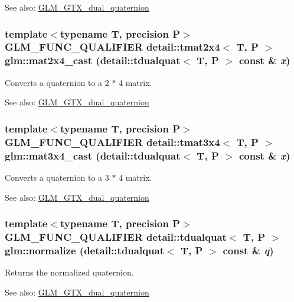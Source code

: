 \begin{Desc}
\item[See also:]\hyperlink{group__gtc__dual__quaternion}{GLM\_\-GTX\_\-dual\_\-quaternion} \end{Desc}
\hypertarget{group__gtc__dual__quaternion_g5dbb18f30b7a8d6646efd9e765e04535}{
\subsubsection[mat2x4\_\-cast]{\setlength{\rightskip}{0pt plus 5cm}template$<$typename T, precision P$>$ GLM\_\-FUNC\_\-QUALIFIER detail::tmat2x4$<$ T, P $>$ glm::mat2x4\_\-cast (detail::tdualquat$<$ T, P $>$ const \& {\em x})}}
\label{group__gtc__dual__quaternion_g5dbb18f30b7a8d6646efd9e765e04535}


Converts a quaternion to a 2 $\ast$ 4 matrix.

\begin{Desc}
\item[See also:]\hyperlink{group__gtc__dual__quaternion}{GLM\_\-GTX\_\-dual\_\-quaternion} \end{Desc}
\hypertarget{group__gtc__dual__quaternion_gbd9f9dad6fbec2e89d5b239b8dc37096}{
\subsubsection[mat3x4\_\-cast]{\setlength{\rightskip}{0pt plus 5cm}template$<$typename T, precision P$>$ GLM\_\-FUNC\_\-QUALIFIER detail::tmat3x4$<$ T, P $>$ glm::mat3x4\_\-cast (detail::tdualquat$<$ T, P $>$ const \& {\em x})}}
\label{group__gtc__dual__quaternion_gbd9f9dad6fbec2e89d5b239b8dc37096}


Converts a quaternion to a 3 $\ast$ 4 matrix.

\begin{Desc}
\item[See also:]\hyperlink{group__gtc__dual__quaternion}{GLM\_\-GTX\_\-dual\_\-quaternion} \end{Desc}
\hypertarget{group__gtc__dual__quaternion_g861508468b4982401f1ae5b4919c5678}{
\subsubsection[normalize]{\setlength{\rightskip}{0pt plus 5cm}template$<$typename T, precision P$>$ GLM\_\-FUNC\_\-QUALIFIER detail::tdualquat$<$ T, P $>$ glm::normalize (detail::tdualquat$<$ T, P $>$ const \& {\em q})}}
\label{group__gtc__dual__quaternion_g861508468b4982401f1ae5b4919c5678}


Returns the normalized quaternion.

\begin{Desc}
\item[See also:]\hyperlink{group__gtc__dual__quaternion}{GLM\_\-GTX\_\-dual\_\-quaternion} \end{Desc}
